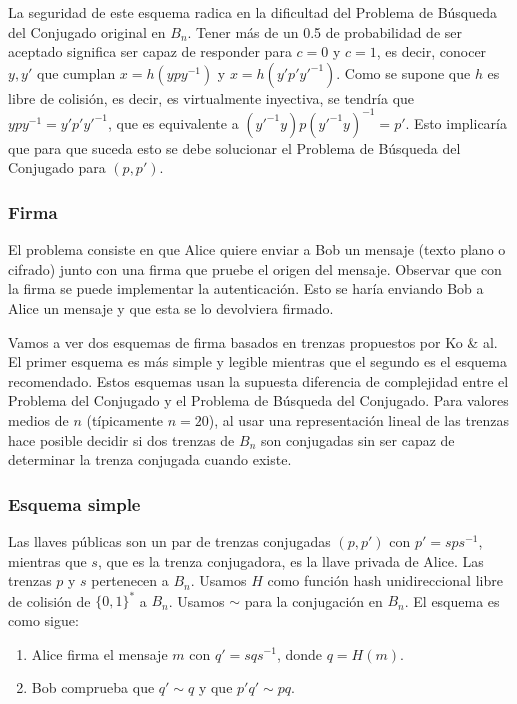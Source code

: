 \documentclass[12pt]{article}
\theoremstyle{definition}
\begin{document}
La seguridad de este esquema radica en la dificultad del Problema de Búsqueda del Conjugado original en $B_n$. Tener más de un 0.5 de probabilidad de ser aceptado significa ser capaz de responder para $c=0$ y $c=1$, es decir, conocer $y,y'$ que cumplan $x=h(ypy^{-1})$ y $x=h(y'p'y'^{-1})$. Como se supone que $h$ es libre de colisión, es decir, es virtualmente inyectiva, se tendría que $ypy^{-1}=y'p'y'^{-1}$, que es equivalente a $(y'^{-1}y)p(y'^{-1}y)^{-1}=p'$. Esto implicaría que para que suceda esto se debe solucionar el Problema de Búsqueda del Conjugado para $(p,p')$.

\subsubsection{Firma}
El problema consiste en que Alice quiere enviar a Bob un mensaje (texto plano o cifrado) junto con una firma que pruebe el origen del mensaje. Observar que con la firma se puede implementar la autenticación. Esto se haría enviando Bob a Alice un mensaje y que esta se lo devolviera firmado.

Vamos a ver dos esquemas de firma basados en trenzas propuestos por Ko \& al. El primer esquema es más simple y legible mientras que el segundo es el esquema recomendado. Estos esquemas usan la supuesta diferencia de complejidad entre el Problema del Conjugado y el Problema de Búsqueda del Conjugado. Para valores medios de $n$ (típicamente $n=20$), al usar una representación lineal de las trenzas hace posible decidir si dos trenzas de $B_n$ son conjugadas sin ser capaz de determinar la trenza conjugada cuando existe.

\subsubsection*{Esquema simple}
Las llaves públicas son un par de trenzas conjugadas $(p,p')$ con $p'=sps^{-1}$, mientras que $s$, que es la trenza conjugadora, es la llave privada de Alice. Las trenzas $p$ y $s$ pertenecen a $B_n$. Usamos $H$ como función hash unidireccional libre de colisión de $\{0,1\}^*$ a $B_n$. Usamos $\sim$ para la conjugación en $B_n$. El esquema es como sigue:


\begin{enumerate}
\item Alice firma el mensaje $m$ con $q'=sqs^{-1}$, donde $q=H(m)$.
\item Bob comprueba que $q'\sim q$ y que $p'q'\sim pq$.
\end{enumerate}
\end{document}
